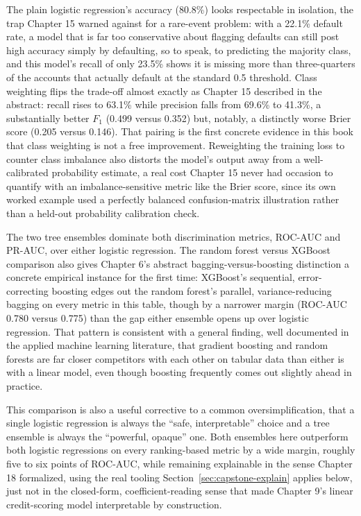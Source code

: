 \documentclass[../ai_in_finance]{subfiles}
\begin{document}
The plain logistic regression's accuracy (80.8\%) looks respectable in isolation, the trap Chapter 15 warned against for a rare-event problem: with a 22.1\% default rate, a model that is far too conservative about flagging defaults can still post high accuracy simply by defaulting, so to speak, to predicting the majority class, and this model's recall of only 23.5\% shows it is missing more than three-quarters of the accounts that actually default at the standard 0.5 threshold. Class weighting flips the trade-off almost exactly as Chapter 15 described in the abstract: recall rises to 63.1\% while precision falls from 69.6\% to 41.3\%, a substantially better $F_1$ (0.499 versus 0.352) but, notably, a distinctly worse Brier score (0.205 versus 0.146). That pairing is the first concrete evidence in this book that class weighting is not a free improvement. Reweighting the training loss to counter class imbalance also distorts the model's output away from a well-calibrated probability estimate, a real cost Chapter 15 never had occasion to quantify with an imbalance-sensitive metric like the Brier score, since its own worked example used a perfectly balanced confusion-matrix illustration rather than a held-out probability calibration check.

The two tree ensembles dominate both discrimination metrics, ROC-AUC and PR-AUC, over either logistic regression. The random forest versus XGBoost comparison also gives Chapter 6's abstract bagging-versus-boosting distinction a concrete empirical instance for the first time: XGBoost's sequential, error-correcting boosting edges out the random forest's parallel, variance-reducing bagging on every metric in this table, though by a narrower margin (ROC-AUC 0.780 versus 0.775) than the gap either ensemble opens up over logistic regression. That pattern is consistent with a general finding, well documented in the applied machine learning literature, that gradient boosting and random forests are far closer competitors with each other on tabular data than either is with a linear model, even though boosting frequently comes out slightly ahead in practice.

This comparison is also a useful corrective to a common oversimplification, that a single logistic regression is always the ``safe, interpretable'' choice and a tree ensemble is always the ``powerful, opaque'' one. Both ensembles here outperform both logistic regressions on every ranking-based metric by a wide margin, roughly five to six points of ROC-AUC, while remaining explainable in the sense Chapter 18 formalized, using the real tooling Section~\ref{sec:capstone-explain} applies below, just not in the closed-form, coefficient-reading sense that made Chapter 9's linear credit-scoring model interpretable by construction.
\end{document}
